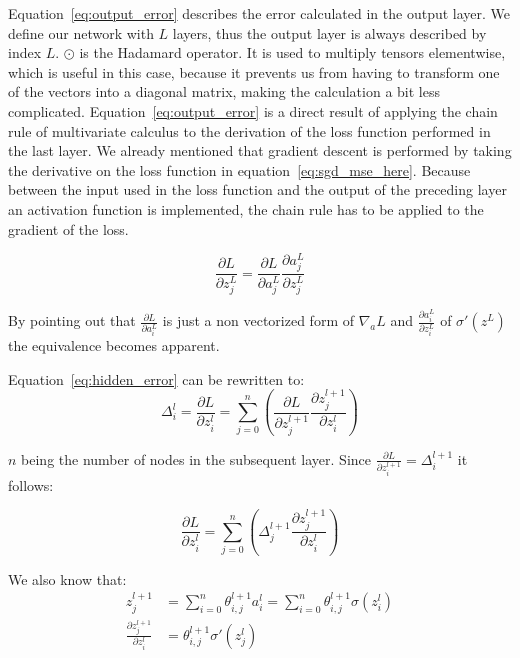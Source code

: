 Equation~\eqref{eq:output_error} describes the error calculated in the output layer. We define our network with $L$ layers, thus the output layer is always described by index $L$.
$\odot$ is the Hadamard operator. It is used to multiply tensors elementwise, which is useful in this case, because it prevents us from having to transform one of the vectors into a diagonal matrix, making the calculation a bit less complicated.
Equation~\eqref{eq:output_error} is a direct result of applying the chain rule of multivariate calculus to the derivation of the loss function performed in the last layer.
We already mentioned that gradient descent is performed by taking the derivative on the loss function in equation~\eqref{eq:sgd_mse_here}.
Because between the input used in the loss function and the output of the preceding layer an activation function is implemented, the chain rule has to be applied to the gradient of the loss.

\begin{equation}
    \frac{\partial L}{\partial z^L_j} = \frac{\partial L}{\partial a^L_j}\frac{\partial a^L_j}{\partial z^L_j}
    \label{eq:proof_loss_chain_rule}
\end{equation}

By pointing out that $\frac{\partial L}{\partial a^L_i}$ is just a non vectorized form of $\nabla_a L$ and $\frac{\partial a^L_i}{\partial z^L_i}$ of $\sigma'(z^L)$ the equivalence becomes apparent.

Equation~\eqref{eq:hidden_error} can be rewritten to:
\begin{equation}
    \varDelta^l_i = \frac{\partial L}{\partial z^l_i} = \sum_{j=0}^n (\frac{\partial L}{\partial z^{l+1}_j}\frac{\partial z^{l+1}_j}{\partial z^l_i})
\end{equation}

$n$ being the number of nodes in the subsequent layer. Since $\frac{\partial L}{\partial z^{l+1}_i} = \varDelta^{l+1}_i$ it follows:

\begin{equation}
    \frac{\partial L}{\partial z^l_i} = \sum_{j=0}^n (\varDelta^{l+1}_j \frac{\partial z^{l+1}_j}{\partial z^{l}_i})
    \label{eq:hidden_error_intermediate}
\end{equation}

We also know that:
\begin{equation}
    \begin{split}
    z^{l+1}_j & = \sum_{i=0}^n \theta^{l+1}_{i,j} a^l_i = \sum_{i=0}^n \theta^{l+1}_{i, j} \sigma(z^l_i) \\
    \frac{\partial z_j^{l+1}}{\partial z_i^l} & = \theta^{l+1}_{i,j} \sigma'(z^l_j)
    \end{split}
\end{equation}

